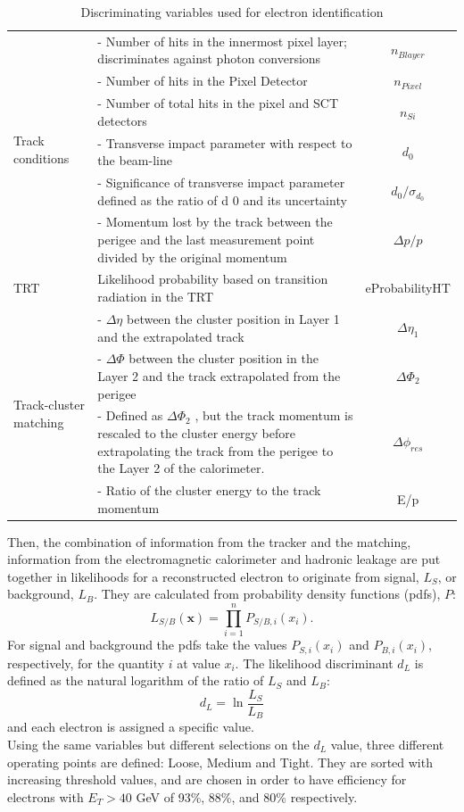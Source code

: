 \documentclass[a4paper, oneside, 11pt, openright]{book}
\begin{document}
\begin{center}
\begin{table}[htbp]
{\begin{tabular}{lp{9cm}c}
					\midrule
					\multirow[t]{6}{*}{Track conditions}
					& - Number of hits in the innermost pixel layer; discriminates against photon conversions & $n_{Blayer}$ \\
					& - Number of hits in the Pixel Detector & $n_{Pixel}$ \\
					& - Number of total hits in the pixel and SCT detectors & $n_{Si}$ \\
					& - Transverse impact parameter with respect to the beam-line & $d_0$ \\
					& - Significance of transverse impact parameter defined as the ratio of d 0 and its uncertainty & $d_0/\sigma_{d_0}$ \\
					& - Momentum lost by the track between the perigee and the last measurement point divided by the original momentum & $\Delta p/p$ \\
					\midrule 
					TRT & Likelihood probability based on transition radiation in the TRT & eProbabilityHT \\
					\midrule 
					\multirow[t]{4}{*}{Track-cluster matching}
					& - $\Delta \eta$ between the cluster position in Layer 1 and the extrapolated track & $\Delta \eta_1$ \\
					& - $\Delta \Phi$ between the cluster position in the Layer 2 and the track extrapolated from the perigee & $\Delta \Phi_2$ \\
					& - Defined as $\Delta \Phi_2$ , but the track momentum is rescaled to the cluster energy before extrapolating the track from the perigee to the Layer 2 of the calorimeter. & $\Delta \phi_{res}$ \\
					& - Ratio of the cluster energy to the track momentum & E/p \\
					\bottomrule[1.5pt]
				\end{tabular}}
				\caption{Discriminating variables used for electron identification \cite{Identification}}
				\label{tab:el parameters}
			\end{table}
		\end{center}
			Then, the combination of information from the tracker and the matching, information from the electromagnetic calorimeter and hadronic leakage  are put together in likelihoods for a reconstructed electron to originate from signal,
			$L_S$, or background, $L_B$. They are calculated from probability density functions (pdfs), $P$:
			$$
			L_{S/B}(\textbf{x}) = \prod_{i=1}^{n}P_{S/B,i}(x_i).
			$$
			For signal and background the pdfs take the values $P_{S,i}(x_i)$ and $P_{B,i}(x_i)$, respectively, for the quantity $i$ at value $x_i$. The likelihood discriminant $d_L$ is defined as the natural logarithm of the ratio of $L_S$ and $L_B$:
			$$
			d_L = \ln{\frac{L_S}{L_B}}
			$$
			and each electron is assigned a specific value.\\
			Using the same variables but different selections on the $d_L$ value, three different operating points are defined: Loose, Medium and Tight. They are sorted with increasing threshold values, and are chosen in order to have efficiency for electrons with $E_T > 40$ GeV of 93\%, 88\%, and 80\% respectively.
			
\end{document}

